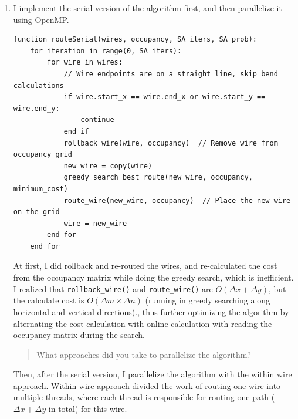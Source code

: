 \documentclass[letterpaper,11pt]{exam}
\begin{document}
\begin{questions}
\begin{enumerate}[label=\roman*.]
        \item I implement the serial version of the algorithm first, and then parallelize it using OpenMP.

              \begin{lstlisting}[]
function routeSerial(wires, occupancy, SA_iters, SA_prob):
    for iteration in range(0, SA_iters):
        for wire in wires:
            // Wire endpoints are on a straight line, skip bend calculations
            if wire.start_x == wire.end_x or wire.start_y == wire.end_y:
                continue
            end if
            rollback_wire(wire, occupancy)  // Remove wire from occupancy grid
            new_wire = copy(wire)
            greedy_search_best_route(new_wire, occupancy, minimum_cost)
            route_wire(new_wire, occupancy)  // Place the new wire on the grid
            wire = new_wire
        end for
    end for
                \end{lstlisting}

              At first, I did rollback and re-routed the wires, and re-calculated the cost from the occupancy matrix while doing the greedy search, which is inefficient.
              I realized that \texttt{rollback\_wire()} and \texttt{route\_wire()} are $O(\Delta x + \Delta y)$, but the calculate cost is $O(\Delta m \times \Delta n)$ (running in greedy searching along horizontal and vertical directions).,
              thus further optimizing the algorithm by alternating the cost calculation with online calculation with reading the occupancy matrix during the search. \\

              \begin{quote}
                  \hspace{-1.5cm} What approaches did you take to parallelize the algorithm?
              \end{quote}

              Then, after the serial version, I parallelize the algorithm with the within wire approach.
              Within wire approach divided the work of routing one wire into multiple threads, where each thread is responsible for routing one path ($\Delta x + \Delta y$ in total) for this wire. \\


\end{enumerate}
\end{questions}
\end{document}
